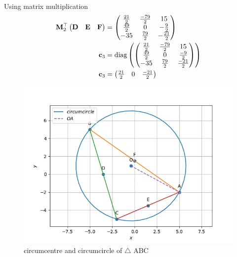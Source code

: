 \documentclass[10pt]{book}
\begin{document}
\begin{enumerate}[label=\thesubsection.\arabic*.,ref=\thesubsection.\theenumi]
\begin{align}
\end{align}
Using matrix multiplication
\begin{align}
 \mathbf{M}_2^{\top}\begin{pmatrix}\mathbf{D} & \mathbf{E} &\mathbf{F}\end{pmatrix} &=\begin{pmatrix} \frac{21}{2} & \frac{-79}{2} & 15 \\ \frac{49}{2} & 0 & -\frac{9}{2} \\ -35 & \frac{79}{2} & -\frac{21}{2} \end{pmatrix} \\
    \mathbf{c}_3 &= \text{diag}\left( \begin{pmatrix} \frac{21}{2} & \frac{-79}{2} & 15 \\ \frac{49}{2} & 0 & \frac{-9}{2} \\ -35 & \frac{79}{2} & \frac{-21}{2} \end{pmatrix} \right) \\
 \mathbf{c}_3   &= \begin{pmatrix} \frac{21}{2} & 0 & \frac{-21}{2}\end{pmatrix}
\end{align}
\begin{figure}[H]
    \centering
     \includegraphics{figs/OA.jpg}
    \caption{circumcentre and circumcircle of $\triangle$ ABC}
    \label{fig:circumradius_o}
\end{figure}
\end{enumerate}
\end{document}
